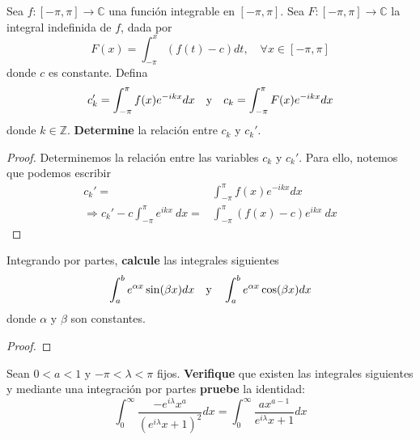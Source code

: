 \documentclass[12pt]{report}
\theoremstyle{largebreak}
\newcommand\cf[3]{\ensuremath{#1:#2\rightarrow#3}}
\begin{document}
    \begin{excer}
        Sea $\cf{f}{[-\pi, \pi]}{\mathbb{C}}$ una función integrable en $[-\pi, \pi]$. Sea $\cf{F}{[-\pi, \pi]}{\mathbb{C}}$ la integral indefinida de $f$, dada por
        \begin{equation*}
            F(x)=\int_{-\pi}^{x}\left(f(t)-c\right)dt,\quad\forall x\in[-\pi, \pi]
        \end{equation*}
        donde $c$ es constante. Defina
        \begin{equation*}
            c_k'=\int_{-\pi}^{\pi}f(x)e^{-ikx}dx\quad\textup{y}\quad c_k=\int_{-\pi}^{\pi}F(x)e^{-ikx}dx
        \end{equation*}
        donde $k\in\mathbb{Z}$. \textbf{Determine} la relación entre $c_k$ y $c_k'$.
    \end{excer}

    \begin{proof}
        Determinemos la relación entre las variables $c_k$ y $c_k'$. Para ello, notemos que podemos escribir
        \begin{equation*}
            \begin{split}
                c_k' = & \int_{-\pi}^{\pi}f(x)e^{-ikx}dx\\
				\Rightarrow c_k'-c \int_{{-\pi}}^{{\pi}} {e^{ikx}} \: d{x}=&\int_{{-\pi}}^{{\pi}} {\left(f(x)-c\right)e^{ikx}} \: d{x}
            \end{split}
        \end{equation*}        
    \end{proof}

    \begin{excer}
        Integrando por partes, \textbf{calcule} las integrales siguientes
        \begin{equation*}
            \int_{a}^{b}e^{\alpha x}\sin(\beta x)dx\quad\textup{y}\quad\int_{a}^{b}e^{\alpha x}\cos(\beta x)dx
        \end{equation*}
        donde $\alpha$ y $\beta$ son constantes.
    \end{excer}

    \begin{proof}
        
    \end{proof}

    \begin{excer}
        Sean $0<a<1$ y $-\pi<\lambda<\pi$ fijos. \textbf{Verifique} que existen las integrales siguientes y mediante una integración por partes \textbf{pruebe} la identidad:
        \begin{equation*}
            \int_{0}^{\infty}\frac{-e^{i\lambda}x^a}{(e^{i\lambda}x+1)^2}dx=\int_{0}^{\infty}\frac{ax^{a-1}}{e^{i\lambda}x+1}dx
        \end{equation*}
    \end{excer}
\end{document}
